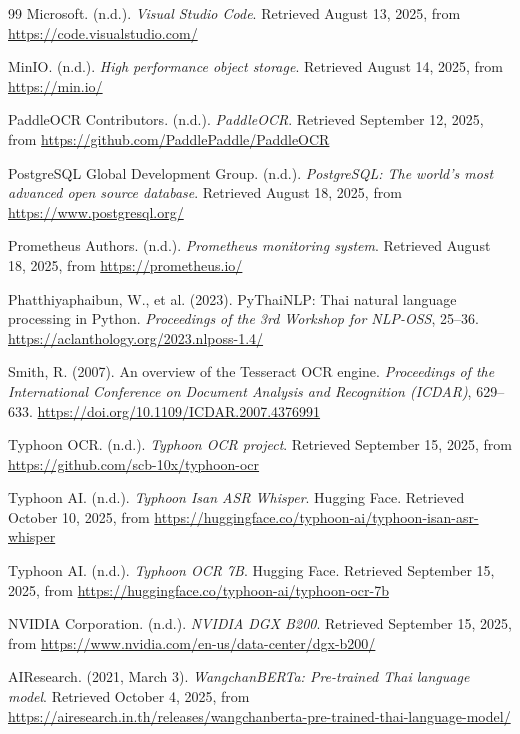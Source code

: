 \documentclass[12pt,oneside,openright,a4paper]{cpe-english-project}
\begin{document}
\begin{thebibliography}{99}
 Microsoft. (n.d.). \textit{Visual Studio Code}. Retrieved August 13, 2025, from \url{https://code.visualstudio.com/}

 MinIO. (n.d.). \textit{High performance object storage}. Retrieved August 14, 2025, from \url{https://min.io/}

 PaddleOCR Contributors. (n.d.). \textit{PaddleOCR}. Retrieved September 12, 2025, from \url{https://github.com/PaddlePaddle/PaddleOCR}

 PostgreSQL Global Development Group. (n.d.). \textit{PostgreSQL: The world's most advanced open source database}. Retrieved August 18, 2025, from \url{https://www.postgresql.org/}

 Prometheus Authors. (n.d.). \textit{Prometheus monitoring system}. Retrieved August 18, 2025, from \url{https://prometheus.io/}

 Phatthiyaphaibun, W., et al. (2023). PyThaiNLP: Thai natural language processing in Python. \textit{Proceedings of the 3rd Workshop for NLP-OSS}, 25--36. \url{https://aclanthology.org/2023.nlposs-1.4/}

 Smith, R. (2007). An overview of the Tesseract OCR engine. \textit{Proceedings of the International Conference on Document Analysis and Recognition (ICDAR)}, 629--633. \url{https://doi.org/10.1109/ICDAR.2007.4376991}

 Typhoon OCR. (n.d.). \textit{Typhoon OCR project}. Retrieved September 15, 2025, from \url{https://github.com/scb-10x/typhoon-ocr}

 Typhoon AI. (n.d.). \textit{Typhoon Isan ASR Whisper}. Hugging Face. Retrieved October 10, 2025, from \url{https://huggingface.co/typhoon-ai/typhoon-isan-asr-whisper}

 Typhoon AI. (n.d.). \textit{Typhoon OCR 7B}. Hugging Face. Retrieved September 15, 2025, from \url{https://huggingface.co/typhoon-ai/typhoon-ocr-7b}

 NVIDIA Corporation. (n.d.). \textit{NVIDIA DGX B200}. Retrieved September 15, 2025, from \url{https://www.nvidia.com/en-us/data-center/dgx-b200/}

 AIResearch. (2021, March 3). \textit{WangchanBERTa: Pre-trained Thai language model}. Retrieved October 4, 2025, from \url{https://airesearch.in.th/releases/wangchanberta-pre-trained-thai-language-model/}

\end{thebibliography}
\end{document}
